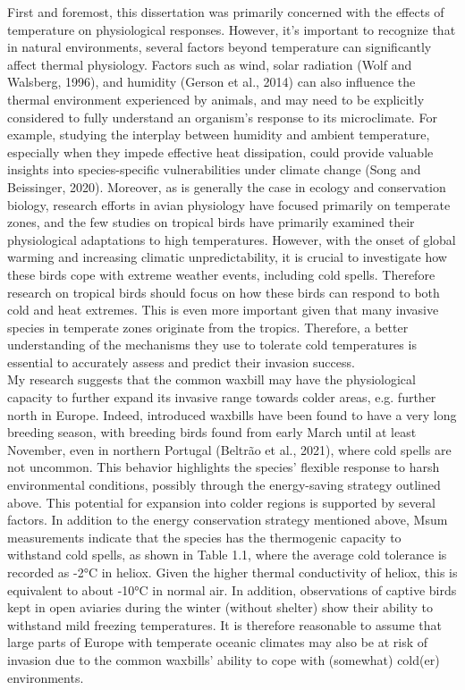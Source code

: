 \documentclass[10pt, twoside]{book} %
\begin{document}
First and foremost, this dissertation was primarily concerned with the effects of temperature on physiological responses. However, it's important to recognize that in natural environments, several factors beyond temperature can significantly affect thermal physiology. Factors such as wind, solar radiation (Wolf and Walsberg, 1996), and humidity (Gerson et al., 2014) can also influence the thermal environment experienced by animals, and may need to be explicitly considered to fully understand an organism's response to its microclimate. For example, studying the interplay between humidity and ambient temperature, especially when they impede effective heat dissipation, could provide valuable insights into species-specific vulnerabilities under climate change (Song and Beissinger, 2020). Moreover, as is generally the case in ecology and conservation biology, research efforts in avian physiology have focused primarily on temperate zones, and the few studies on tropical birds have primarily examined their physiological adaptations to high temperatures. However, with the onset of global warming and increasing climatic unpredictability, it is crucial to investigate how these birds cope with extreme weather events, including cold spells. Therefore research on tropical birds should focus on how these birds can respond to both cold and heat extremes. This is even more important given that many invasive species in temperate zones originate from the tropics. Therefore, a better understanding of the mechanisms they use to tolerate cold temperatures is essential to accurately assess and predict their invasion success.\\

My research suggests that the common waxbill may have the physiological capacity to further expand its invasive range towards colder areas, e.g. further north in Europe. Indeed, introduced waxbills have been found to have a very long breeding season, with breeding birds found from early March until at least November, even in northern Portugal (Beltrão et al., 2021), where cold spells are not uncommon. This behavior highlights the species' flexible response to harsh environmental conditions, possibly through the energy-saving strategy outlined above. This potential for expansion into colder regions is supported by several factors. In addition to the energy conservation strategy mentioned above, Msum measurements indicate that the species has the thermogenic capacity to withstand cold spells, as shown in Table 1.1, where the average cold tolerance is recorded as -2°C in heliox. Given the higher thermal conductivity of heliox, this is equivalent to about -10°C in normal air. In addition, observations of captive birds kept in open aviaries during the winter (without shelter) show their ability to withstand mild freezing temperatures. It is therefore reasonable to assume that large parts of Europe with temperate oceanic climates may also be at risk of invasion due to the common waxbills’ ability to cope with (somewhat) cold(er) environments.\\
\end{document}
